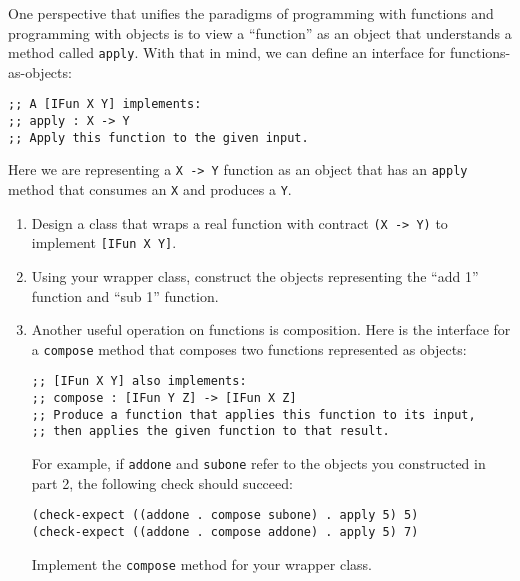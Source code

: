 \documentclass[12pt]{article}                   %
\def\pts#1{\marginpar{\footnotesize \raggedright  \fbox{#1 {\sc Points}}}}
\newenvironment{solution}{}{}
\newcommand\code[1]{\texttt{#1}}
\begin{document}
\begin{problem}\pts{12}

One perspective that unifies the paradigms of programming with
functions and programming with objects is to view a ``function'' as an
object that understands a method called \code{apply}.  With that in
mind, we can define an interface for functions-as-objects:

\begin{verbatim}
;; A [IFun X Y] implements:
;; apply : X -> Y
;; Apply this function to the given input.
\end{verbatim}

Here we are representing a \code{X -> Y} function as an object that
has an \code{apply} method that consumes an \code{X} and produces a
\code{Y}.

\begin{enumerate}
\item Design a class that wraps a real function with contract \code{(X
  -> Y)} to implement \code{[IFun X Y]}.

\item Using your wrapper class, construct the objects representing the
  ``add 1'' function and ``sub 1'' function.

\item Another useful operation on functions is composition.  Here is
  the interface for a \code{compose} method that composes two functions
  represented as objects:

\begin{verbatim}
;; [IFun X Y] also implements:
;; compose : [IFun Y Z] -> [IFun X Z]
;; Produce a function that applies this function to its input, 
;; then applies the given function to that result.
\end{verbatim}

For example, if \code{addone} and \code{subone} refer to the objects
you constructed in part 2, the following check should succeed:

\begin{verbatim}
(check-expect ((addone . compose subone) . apply 5) 5)
(check-expect ((addone . compose addone) . apply 5) 7)
\end{verbatim}

Implement the \code{compose} method for your wrapper class.
\end{enumerate}

\begin{solution}


\end{solution}
\end{problem}
\end{document}
